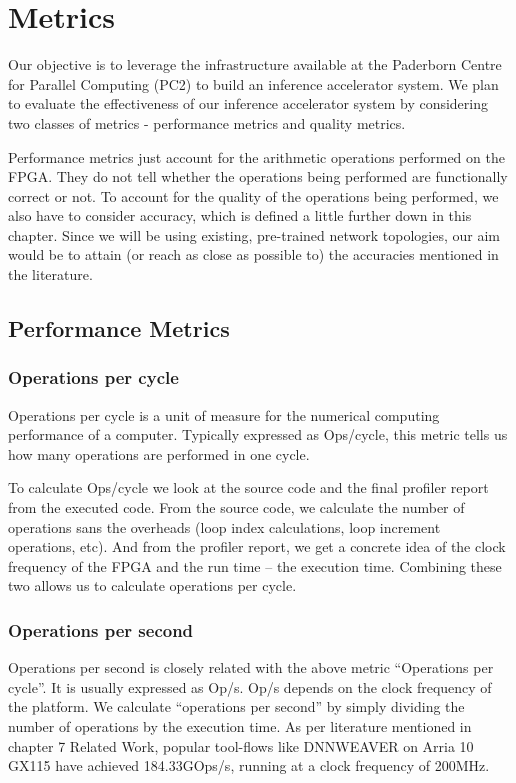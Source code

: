 \documentclass[titlepage]{report}
\begin{document}
\pagebreak





\chapter{Metrics}
Our objective is to leverage the infrastructure available at the Paderborn Centre for Parallel Computing (PC2) to build an inference accelerator system. We plan to evaluate the effectiveness of our inference accelerator system by considering two classes of metrics - performance metrics and quality metrics.  

Performance metrics just account for the arithmetic operations performed on the FPGA. They do not tell whether the operations being performed are functionally correct or not. To account for the quality of the operations being performed, we also have to consider accuracy, which is defined a little further down in this chapter. Since we will be using existing, pre-trained network topologies, our aim would be to attain (or reach as close as possible to)  the accuracies mentioned in the literature.

\section{Performance Metrics}

\subsection{Operations per cycle}
Operations per cycle is a unit of measure for the numerical computing performance of a computer. Typically expressed as Ops/cycle, this metric tells us how many operations are performed in one cycle.  

To calculate Ops/cycle we look at the source code and the final profiler report from the executed code. From the source code, we calculate the number of operations sans the overheads (loop index calculations, loop increment operations, etc). And from the profiler report, we get a concrete idea of the clock frequency of the FPGA and the run time – the execution time. Combining these two allows us to calculate operations per cycle.

\subsection{Operations per second}
Operations per second is closely related with the above metric “Operations per cycle”. It is usually expressed as Op/s. Op/s depends on the clock frequency of the platform. 
We calculate “operations per second” by simply dividing the number of operations by the execution time.  
As per literature mentioned in chapter 7 Related Work, popular tool-flows like DNNWEAVER on Arria 10 GX115 have achieved 184.33GOps/s, running at a clock frequency of 200MHz.
\end{document}
